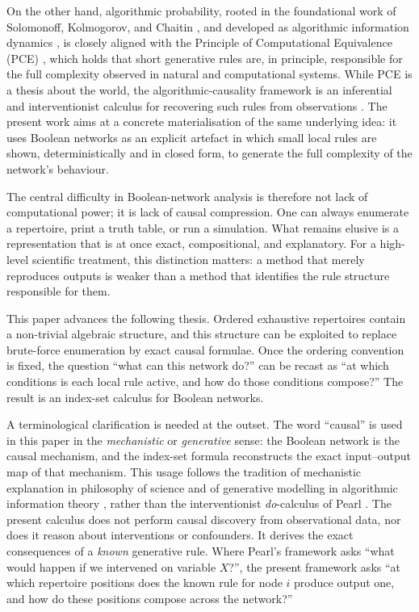 \documentclass[11pt]{article}
\theoremstyle{definition}
\begin{document}
On the other hand, algorithmic probability, rooted in the foundational work of Solomonoff,
Kolmogorov, and Chaitin \cite{solomonoff1964formal,kolmogorov1965three,chaitin1966length}, and
developed as algorithmic information dynamics \cite{zenilcalculus,zenildeconv}, is closely aligned
with the Principle of Computational Equivalence (PCE) \cite{wolfram2002new}, which holds that short
generative rules are, in principle, responsible for the full complexity observed in natural and
computational systems. While PCE is a thesis about the world, the algorithmic-causality framework
is an inferential and interventionist calculus for recovering such rules from observations
\cite{zenilcalculus}. The present work aims at a concrete materialisation of the same underlying
idea: it uses Boolean networks as an explicit artefact in which small local rules are shown,
deterministically and in closed form, to generate the full complexity of the network's behaviour.

The central difficulty in Boolean-network analysis is therefore not lack of computational power; it is
lack of causal compression. One can always enumerate a repertoire, print a truth table, or run a
simulation. What remains elusive is a representation that is at once exact, compositional, and
explanatory. For a high-level scientific treatment, this distinction matters: a method that merely
reproduces outputs is weaker than a method that identifies the rule structure responsible for them.

This paper advances the following thesis. Ordered exhaustive repertoires contain a non-trivial algebraic
structure, and this structure can be exploited to replace brute-force enumeration by exact causal formulae.
Once the ordering convention is fixed, the question ``what can this network do?'' can be recast as ``at
which conditions is each local rule active, and how do those conditions compose?'' The result is an
index-set calculus for Boolean networks.

A terminological clarification is needed at the outset. The word ``causal'' is used in this paper
in the \emph{mechanistic} or \emph{generative} sense: the Boolean network is the causal mechanism,
and the index-set formula reconstructs the exact input--output map of that mechanism. This usage
follows the tradition of mechanistic explanation in philosophy of science
\cite{machamer2000thinking,woodward2003making} and of generative modelling in algorithmic
information theory \cite{zenilcalculus}, rather than the interventionist \emph{do}-calculus of
Pearl \cite{pearl2009causality}. The present calculus does not perform causal discovery from
observational data, nor does it reason about interventions or confounders. It derives the exact
consequences of a \emph{known} generative rule. Where Pearl's framework asks ``what would happen
if we intervened on variable \(X\)?'', the present framework asks ``at which repertoire positions
does the known rule for node \(i\) produce output one, and how do these positions compose across
the network?''
\end{document}

